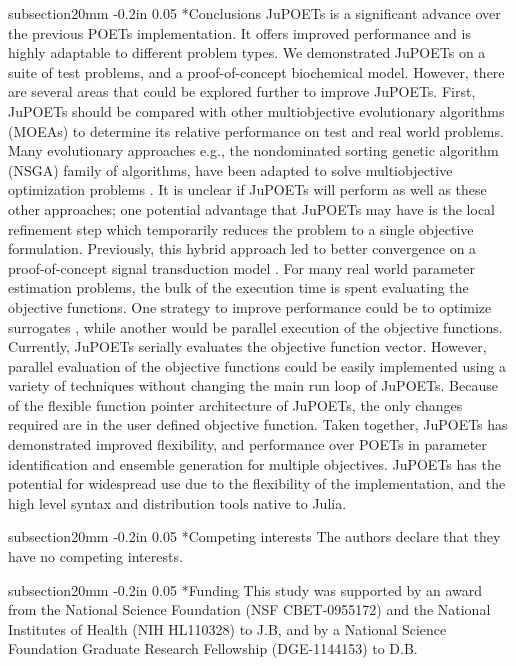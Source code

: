 \documentclass[12pt]{article}
\makeatletter
\renewcommand\section{\@startsection
	{subsection}{2}{0mm}
	{-0.2in}
	{0.05\baselineskip}
	{\normalfont\large\bfseries}}
\makeatother
\begin{document}
\section*{Conclusions}
JuPOETs is a significant advance over the previous POETs implementation.
It offers improved performance and is highly adaptable to different problem types.
We demonstrated JuPOETs on a suite of test problems, and a proof-of-concept biochemical model.
However, there are several areas that could be explored further to improve JuPOETs.
First, JuPOETs should be compared with other multiobjective evolutionary algorithms (MOEAs) to determine its relative performance on test and real world problems.
Many evolutionary approaches e.g., the nondominated sorting genetic algorithm (NSGA) family of algorithms, have been adapted to solve multiobjective optimization problems \cite{DEB2002,HUBAND2006}. It is unclear if JuPOETs will perform as well as these other approaches;
one potential advantage that JuPOETs may have is the local refinement step which temporarily reduces the problem to a single objective formulation.
Previously, this hybrid approach led to better convergence on a proof-of-concept signal transduction model \cite{Song:2010aa}.
For many real world parameter estimation problems, the bulk of the execution time is spent evaluating the objective functions.
One strategy to improve performance could be to optimize surrogates \cite{SURROGATES}, while another would be parallel execution of the objective functions.
Currently, JuPOETs serially evaluates the objective function vector.
However, parallel evaluation of the objective functions could be easily implemented using a variety of techniques without changing the main run loop of JuPOETs.
Because of the flexible function pointer architecture of JuPOETs, the only changes required are in the user defined objective function.
Taken together, JuPOETs has demonstrated improved flexibility, and performance over POETs in parameter identification and ensemble generation for multiple objectives.
JuPOETs has the potential for widespread use due to the flexibility of the implementation, and the high level syntax and distribution tools native to Julia.

\clearpage

\section*{Competing interests}
  The authors declare that they have no competing interests.

\section*{Funding}
This study was supported by an award from the National Science Foundation (NSF CBET-0955172) and the National Institutes of Health (NIH HL110328) to J.B, and by
a National Science Foundation Graduate Research Fellowship (DGE-1144153) to D.B.
\end{document}
